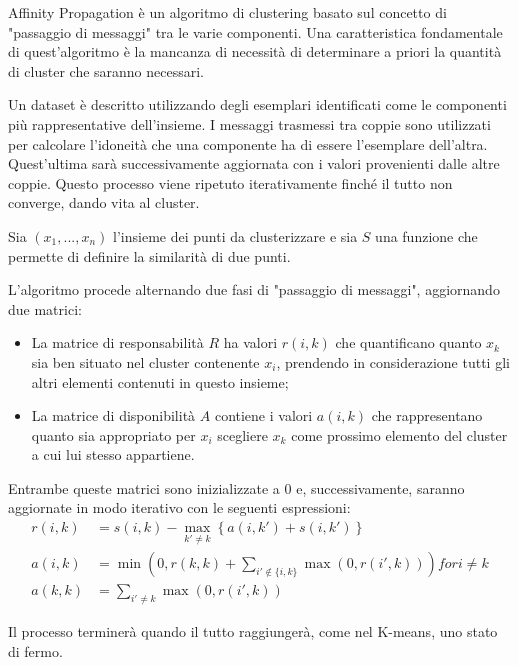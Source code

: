 Affinity Propagation è un algoritmo di clustering basato sul concetto di "passaggio di messaggi" tra le varie componenti. Una caratteristica fondamentale di quest'algoritmo è la mancanza di necessità di determinare a priori la quantità di cluster che saranno necessari.

Un dataset è descritto utilizzando degli esemplari identificati come le componenti più rappresentative dell'insieme. I messaggi trasmessi tra coppie sono utilizzati per calcolare l'idoneità che una componente ha di essere l'esemplare dell'altra. Quest'ultima sarà successivamente aggiornata con i valori provenienti dalle altre coppie. Questo processo viene ripetuto iterativamente finché il tutto non converge, dando vita al cluster.

Sia $(x_1, ..., x_n)$ l'insieme dei punti da clusterizzare e sia $S$ una funzione che permette di definire la similarità di due punti.

L'algoritmo procede alternando due fasi di "passaggio di messaggi", aggiornando due matrici:

\begin{itemize}
	\item La matrice di responsabilità $R$ ha valori $r(i, k)$ che quantificano quanto $x_k$ sia ben situato nel cluster contenente $x_i$, prendendo in considerazione tutti gli altri elementi contenuti in questo insieme;
	\item La matrice di disponibilità $A$ contiene i valori $a(i, k)$ che rappresentano quanto sia appropriato per $x_i$ scegliere $x_k$ come prossimo elemento del cluster a cui lui stesso appartiene.
\end{itemize} 

Entrambe queste matrici sono inizializzate a $0$ e, successivamente, saranno aggiornate in modo iterativo con le seguenti espressioni:
\begin{align*}
	r(i,k) &= s(i,k) - \max_{k' \neq k} \left\{ a(i,k') + s(i,k') \right\}\\
	a(i,k) &= \min \left(0, r(k,k) + \sum_{i' \not\in \{i,k\}} \max(0, r(i',k)) \right) for i \neq k\\
	a(k,k) &= \sum_{i' \neq k} \max(0, r(i',k))
\end{align*}

Il processo terminerà quando il tutto raggiungerà, come nel K-means, uno stato di fermo\cite{affinity}.
